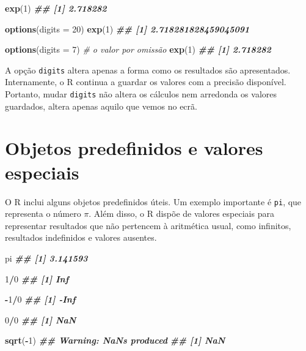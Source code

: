 \documentclass[
  portuguese,
  11pt,
  openany]{book}
\newenvironment{Shaded}{\begin{snugshade}}{\end{snugshade}}
\newcommand{\AttributeTok}[1]{\textcolor[rgb]{0.13,0.29,0.53}{#1}}
\newcommand{\CommentTok}[1]{\textcolor[rgb]{0.56,0.35,0.01}{\textit{#1}}}
\newcommand{\DecValTok}[1]{\textcolor[rgb]{0.00,0.00,0.81}{#1}}
\newcommand{\DocumentationTok}[1]{\textcolor[rgb]{0.56,0.35,0.01}{\textbf{\textit{#1}}}}
\newcommand{\FunctionTok}[1]{\textcolor[rgb]{0.13,0.29,0.53}{\textbf{#1}}}
\newcommand{\NormalTok}[1]{#1}
\newcommand{\SpecialCharTok}[1]{\textcolor[rgb]{0.81,0.36,0.00}{\textbf{#1}}}
\begin{document}
\begin{Shaded}
\begin{Highlighting}[]
\FunctionTok{exp}\NormalTok{(}\DecValTok{1}\NormalTok{)}
\DocumentationTok{\#\# [1] 2.718282}

\FunctionTok{options}\NormalTok{(}\AttributeTok{digits =} \DecValTok{20}\NormalTok{)}
\FunctionTok{exp}\NormalTok{(}\DecValTok{1}\NormalTok{)}
\DocumentationTok{\#\# [1] 2.718281828459045091}

\FunctionTok{options}\NormalTok{(}\AttributeTok{digits =} \DecValTok{7}\NormalTok{)   }\CommentTok{\# o valor por omissão}
\FunctionTok{exp}\NormalTok{(}\DecValTok{1}\NormalTok{)}
\DocumentationTok{\#\# [1] 2.718282}
\end{Highlighting}
\end{Shaded}

A opção \texttt{digits} altera apenas a forma como os resultados são apresentados. Internamente, o R continua a guardar os valores com a precisão disponível. Portanto, mudar \texttt{digits} não altera os cálculos nem arredonda os valores guardados, altera apenas aquilo que vemos no ecrã.

\section{Objetos predefinidos e valores especiais}\label{objetos-predefinidos-e-valores-especiais}

O R inclui alguns objetos predefinidos úteis. Um exemplo importante é \texttt{pi}, que representa o número \(\pi\). Além disso, o R dispõe de valores especiais para representar resultados que não pertencem à aritmética usual, como infinitos, resultados indefinidos e valores ausentes.

\begin{Shaded}
\begin{Highlighting}[]
\NormalTok{pi}
\DocumentationTok{\#\# [1] 3.141593}

\DecValTok{1}\SpecialCharTok{/}\DecValTok{0}
\DocumentationTok{\#\# [1] Inf}

\SpecialCharTok{{-}}\DecValTok{1}\SpecialCharTok{/}\DecValTok{0}
\DocumentationTok{\#\# [1] {-}Inf}

\DecValTok{0}\SpecialCharTok{/}\DecValTok{0}
\DocumentationTok{\#\# [1] NaN}

\FunctionTok{sqrt}\NormalTok{(}\SpecialCharTok{{-}}\DecValTok{1}\NormalTok{)}
\DocumentationTok{\#\# Warning: NaNs produced}
\DocumentationTok{\#\# [1] NaN}
\end{Highlighting}
\end{Shaded}
\end{document}
